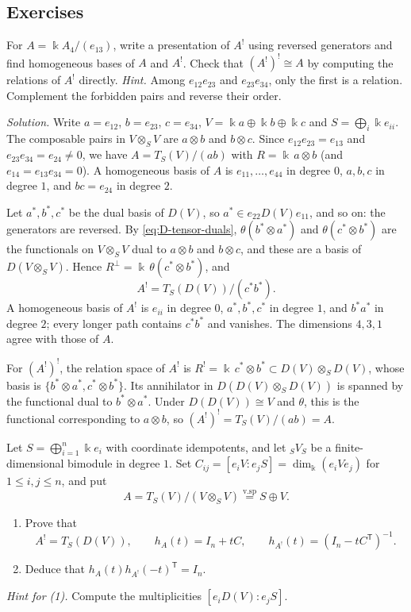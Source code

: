 \subsection{Exercises}

\begin{exercise}
For $A=\Bbbk A_4/(e_{13})$, write a presentation of $A^!$ using reversed generators and find homogeneous bases of $A$ and $A^!$.
Check that $(A^!)^!\cong A$ by computing the relations of $A^!$ directly.
\emph{Hint.} Among $e_{12}e_{23}$ and $e_{23}e_{34}$, only the first is a relation. Complement the forbidden pairs and reverse their order.
\end{exercise}

\begin{hidden}
\emph{Solution.}
Write $a=e_{12}$, $b=e_{23}$, $c=e_{34}$, $V=\Bbbk a\oplus\Bbbk b\oplus\Bbbk c$ and $S=\bigoplus_i\Bbbk e_{ii}$.
The composable pairs in $V\otimes_SV$ are $a\otimes b$ and $b\otimes c$.
Since $e_{12}e_{23}=e_{13}$ and $e_{23}e_{34}=e_{24}\neq0$, we have $A=T_S(V)/(ab)$ with $R=\Bbbk\,a\otimes b$ (and $e_{14}=e_{13}e_{34}=0$).
A homogeneous basis of $A$ is $e_{11},\ldots,e_{44}$ in degree $0$, $a,b,c$ in degree $1$, and $bc=e_{24}$ in degree $2$.

Let $a^*,b^*,c^*$ be the dual basis of $D(V)$, so $a^*\in e_{22}D(V)e_{11}$, and so on: the generators are reversed.
By \eqref{eq:D-tensor-duals}, $\theta(b^*\otimes a^*)$ and $\theta(c^*\otimes b^*)$ are the functionals on $V\otimes_SV$ dual to $a\otimes b$ and $b\otimes c$, and these are a basis of $D(V\otimes_SV)$.
Hence $R^\perp=\Bbbk\,\theta(c^*\otimes b^*)$, and
\[
A^!=T_S(D(V))/(c^*b^*).
\]
A homogeneous basis of $A^!$ is $e_{ii}$ in degree $0$, $a^*,b^*,c^*$ in degree $1$, and $b^*a^*$ in degree $2$; every longer path contains $c^*b^*$ and vanishes.
The dimensions $4,3,1$ agree with those of $A$.

For $(A^!)^!$, the relation space of $A^!$ is $R^!=\Bbbk\,c^*\otimes b^*\subset D(V)\otimes_SD(V)$, whose basis is $\{b^*\otimes a^*,c^*\otimes b^*\}$.
Its annihilator in $D(D(V)\otimes_SD(V))$ is spanned by the functional dual to $b^*\otimes a^*$.
Under $D(D(V))\cong V$ and $\theta$, this is the functional corresponding to $a\otimes b$, so $(A^!)^!=T_S(V)/(ab)=A$.
\end{hidden}


\begin{exercise}
Let $S=\bigoplus_{i=1}^n\Bbbk e_i$ with coordinate idempotents, and let ${}_SV_S$ be a finite-dimensional bimodule in degree $1$.
Set $C_{ij}=[e_iV:e_jS]=\dim_\Bbbk(e_iVe_j)$ for $1\leq i,j\leq n$, and put
\[
A=T_S(V)/(V\otimes_S V)\stackrel{\text{v.sp}}{=}S\oplus V.
\]
\begin{enumerate}
\item Prove that
\[
A^!=T_S(D(V)),\qquad h_A(t)=I_n+tC,\qquad
h_{A^!}(t)=(I_n-tC^{\mathsf T})^{-1}.
\]
\item Deduce that $h_A(t)h_{A^!}(-t)^{\mathsf T}=I_n$.
\end{enumerate}
\emph{Hint for (1).} Compute the multiplicities $[e_iD(V):e_jS]$.
\end{exercise}


